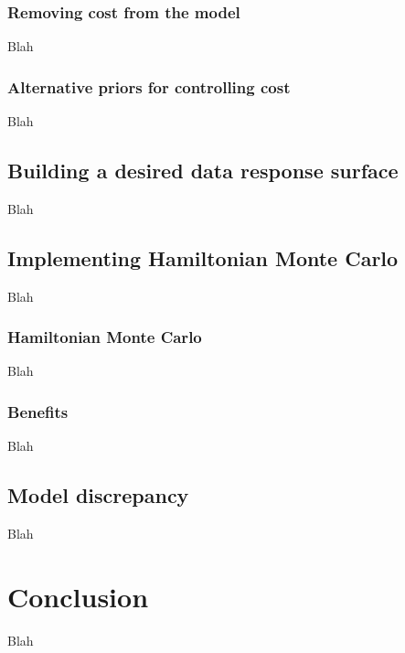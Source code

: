 \documentclass{article}
\begin{document}
\subsubsection{Removing cost from the model}
Blah

\subsubsection{Alternative priors for controlling cost}
Blah

\subsection{Building a desired data response surface}
Blah

\subsection{Implementing Hamiltonian Monte Carlo}
Blah

\subsubsection{Hamiltonian Monte Carlo}
Blah

\subsubsection{Benefits}
Blah

\subsection{Model discrepancy}
Blah

\section{Conclusion}
Blah















\end{document}
